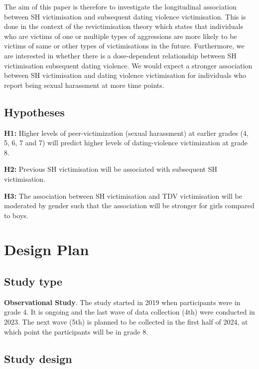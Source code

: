 \documentclass[
]{article}
\begin{document}
The aim of this paper is therefore to investigate the longitudinal
association between SH victimisation and subsequent dating violence
victimisation. This is done in the context of the revictimisation theory
which states that individuals who are victims of one or multiple types
of aggressions are more likely to be victims of same or other types of
victimisations in the future. Furthermore, we are interested in whether
there is a dose-dependent relationship between SH victimisation
subsequent dating violence. We would expect a stronger association
between SH victimisation and dating violence victimisation for
individuals who report being sexual harassment at more time points.

\subsection{Hypotheses}\label{hypotheses}

\textbf{H1:} Higher levels of peer-victimization (sexual harassment) at
earlier grades (4, 5, 6, 7 and 7) will predict higher levels of
dating-violence victimization at grade 8.

\textbf{H2:} Previous SH victimisation will be associated with
subsequent SH victimisation.

\textbf{H3:} The association between SH victimisation and TDV
victimisation will be moderated by gender such that the association will
be stronger for girls compared to boys.

\section{Design Plan}\label{design-plan}

\subsection{Study type}\label{study-type}

\textbf{Observational Study}. The study started in 2019 when
participants were in grade 4. It is ongoing and the last wave of data
collection (4th) were conducted in 2023. The next wave (5th) is planned
to be collected in the first half of 2024, at which point the
participants will be in grade 8.

\subsection{Study design}\label{study-design}
\end{document}

